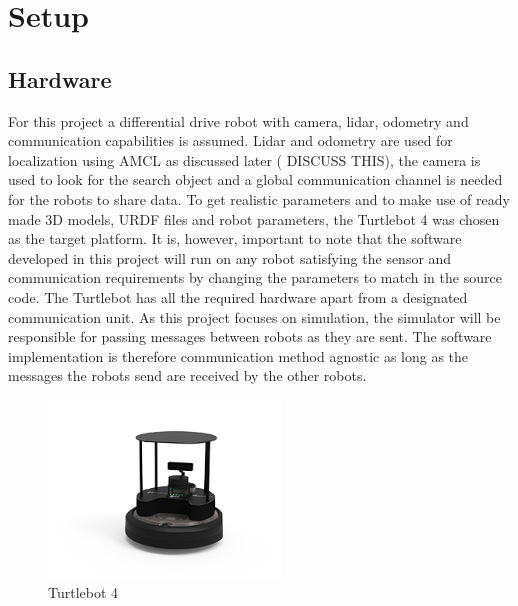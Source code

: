 \section{Setup}
\label{sec:setup}

\subsection{Hardware}

For this project a differential drive robot with camera, lidar, odometry and communication capabilities is assumed. Lidar and odometry are used for localization using AMCL as discussed later ({\color{red} DISCUSS THIS}), the camera is used to look for the search object and a global communication channel is needed for the robots to share data. To get realistic parameters and to make use of ready made 3D models, URDF files and robot parameters, the Turtlebot 4 \cite{tb4} was chosen as the target platform. It is, however, important to note that the software developed in this project will run on any robot satisfying the sensor and communication requirements by changing the parameters to match in the source code. The Turtlebot has all the required hardware apart from a {\color{red} designated communication unit}. As this project focuses on simulation, the simulator will be responsible for passing messages between robots as they are sent. The software implementation is therefore {\color{red} communication method agnostic} as long as the messages the robots send are received by the other robots.

\begin{figure}[h]
    \begin{center}
        \includegraphics[width=0.55\textwidth]{figures/tb4.png}
    \end{center}
    \caption{Turtlebot 4}\label{fig:tb4}
\end{figure}



